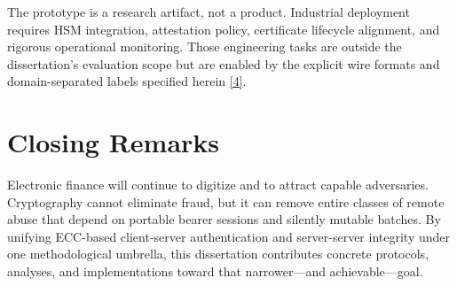 \indent The prototype is a research artifact, not a product. Industrial deployment requires HSM integration, attestation policy, certificate lifecycle alignment, and rigorous operational monitoring. Those engineering tasks are outside the dissertation's evaluation scope but are enabled by the explicit wire formats and domain-separated labels specified herein \hyperref[ref:4]{[4]}.

\section{Closing Remarks}

\indent Electronic finance will continue to digitize and to attract capable adversaries. Cryptography cannot eliminate fraud, but it can remove entire classes of remote abuse that depend on portable bearer sessions and silently mutable batches. By unifying ECC-based client-server authentication and server-server integrity under one methodological umbrella, this dissertation contributes concrete protocols, analyses, and implementations toward that narrower---and achievable---goal.

